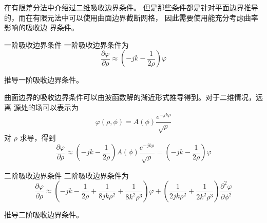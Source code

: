 \par 在有限差分法中介绍过二维吸收边界条件。
但是那些条件都是针对平面边界推导
的，而在有限元法中可以使用曲面边界截断网格，
因此需要使用能充分考虑曲率影响的吸收边
界条件。

\begin{theorem}{一阶吸收边界条件}
    一阶吸收边界条件为
    \begin{equation}
        \frac{\partial \varphi}{\partial \rho}
        \approx
        \left(
            -jk-\frac{1}{2\rho}
        \right)\varphi
    \end{equation}
\end{theorem}

\begin{exercise}
    推导一阶吸收边界条件。
\end{exercise}

\begin{solution}
    曲面边界的吸收边界条件可以由波函数解的渐近形式推导得到。对于二维情况，远离
    源处的场可以表示为
    \begin{equation*}
        \varphi(\rho,\phi)=A(\phi)\frac{e^{-jk\rho}}{\sqrt{\rho}}
    \end{equation*}
    对 $\rho$ 求导，得到
    \begin{equation*}
        \frac{\partial \varphi}{\partial \rho}
        \approx
        \left(
            -jk-\frac{1}{2\rho}
        \right)A(\phi)\frac{e^{-jk\rho}}{\sqrt{\rho}}
        =
        \left(
            -jk-\frac{1}{2\rho}
        \right)\varphi
    \end{equation*}
\end{solution}

\begin{theorem}{二阶吸收边界条件}
    二阶吸收边界条件为
    \begin{equation}
        \frac{\partial \varphi}{\partial \rho}
        \approx
        \left(
            -jk-\frac{1}{2\rho}
            +\frac{1}{8jk\rho^2}
            +\frac{1}{8k^2\rho^3}
        \right)\varphi
        +\left(
            \frac{1}{2jk\rho^2}
            +\frac{1}{2k^2\rho^3}
        \right)\frac{\partial^2 \varphi}{\partial \phi^2}
    \end{equation}
\end{theorem}

\begin{exercise}
    推导二阶吸收边界条件。
\end{exercise}


